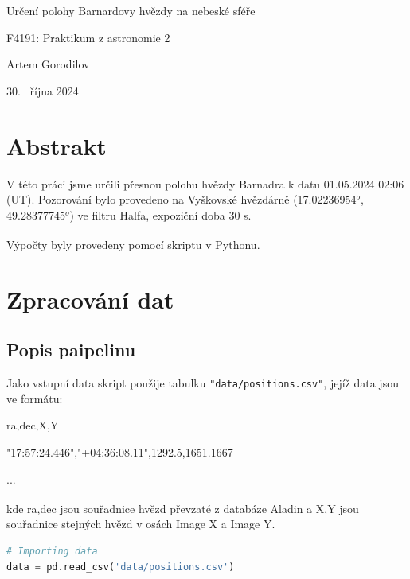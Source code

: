 \documentclass[a4paper,11pt]{article}
\begin{document}
\hline
\begin{center}
\bigskip
\huge Určení polohy Barnardovy hvězdy na nebeské sféře
\vspace{0.5cm}
\par \large F4191: Praktikum z astronomie 2
\par \large Artem Gorodilov
\vspace{0.5cm}
\par \large 30. ~října 2024
\bigskip
\end{center}
\hline
\bigskip


\vskip10pt
    \begin{minipage}[t]{0.5\textwidth} 
        \section{Abstrakt}    
            V této práci jsme určili přesnou polohu hvězdy Barnadra k datu 01.05.2024 02:06 (UT). Pozorování bylo provedeno na Vyškovské hvězdárně (17.02236954$^o$, 49.28377745$^o$) ve filtru Halfa, expoziční doba 30 s.
            \par Výpočty byly provedeny pomocí skriptu v Pythonu\textsuperscript{\cite{github}}.

        \section{Zpracování dat}
            \subsection{Popis paipelinu}    
                Jako vstupní data skript použije tabulku \texttt{"data/positions.csv"}, jejíž data jsou ve formátu: 
                \vspace{5pt}
                \par ra,dec,X,Y
                \par "17:57:24.446","+04:36:08.11",1292.5,1651.1667
                \par ...
                \vspace{10pt}
                \par kde ra,dec jsou souřadnice hvězd převzaté z databáze Aladin\textsuperscript{\cite{aladin}} a X,Y jsou souřadnice stejných hvězd v osách Image X a Image Y.

\begin{lstlisting}[language=Python]
# Importing data
data = pd.read_csv('data/positions.csv')
\end{lstlisting}


\end{minipage}
\end{document}
